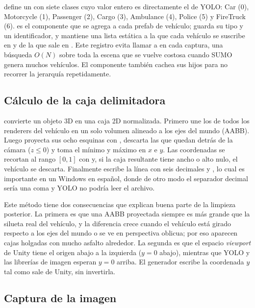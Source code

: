 \documentclass[11pt,a4paper]{article}
\begin{document}
 define un  con siete clases cuyo valor entero es directamente el  de YOLO: Car (0), Motorcycle (1), Passenger (2), Cargo (3), Ambulance (4), Police (5) y FireTruck (6).  es el componente que se agrega a cada prefab de vehículo; guarda su tipo y un identificador, y mantiene una lista estática  a la que cada vehículo se suscribe en  y de la que sale en . Este registro evita llamar a  en cada captura, una búsqueda $O(N)$ sobre toda la escena que se vuelve costosa cuando SUMO genera muchos vehículos. El componente también cachea sus  hijos para no recorrer la jerarquía repetidamente.

\subsection{Cálculo de la caja delimitadora}

 convierte un objeto 3D en una caja 2D normalizada. Primero une los  de todos los renderers del vehículo en un solo volumen alineado a los ejes del mundo (AABB). Luego proyecta sus ocho esquinas con , descarta las que quedan detrás de la cámara ($z \le 0$) y toma el mínimo y máximo en $x$ e $y$. Las coordenadas se recortan al rango $[0, 1]$ con  y, si la caja resultante tiene ancho o alto nulo, el vehículo se descarta. Finalmente  escribe la línea  con seis decimales y , lo cual es importante en un Windows en español, donde de otro modo el separador decimal sería una coma y YOLO no podría leer el archivo.

Este método tiene dos consecuencias que explican buena parte de la limpieza posterior. La primera es que una AABB proyectada siempre es más grande que la silueta real del vehículo, y la diferencia crece cuando el vehículo está girado respecto a los ejes del mundo o se ve en perspectiva oblicua; por eso aparecen cajas holgadas con mucho asfalto alrededor. La segunda es que el espacio \emph{viewport} de Unity tiene el origen abajo a la izquierda ($y = 0$ abajo), mientras que YOLO y las librerías de imagen esperan $y = 0$ arriba. El generador escribe la coordenada $y$ tal como sale de Unity, sin invertirla.

\subsection{Captura de la imagen}
\end{document}
